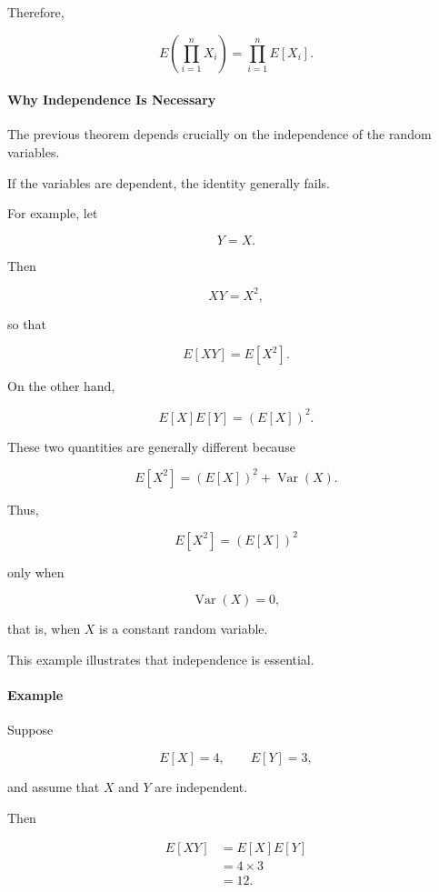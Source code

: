 \documentclass[11pt]{article}
\begin{document}
\begin{mdframed}[
		linewidth=0.8pt,
		roundcorner=6pt,
		backgroundcolor=gray!5,
		linecolor=gray!60,
		innertopmargin=10pt,
		innerbottommargin=10pt,
		innerleftmargin=10pt,
		innerrightmargin=10pt
		]
		Therefore,
		
		\[
		\boxed{
			E\!\left(
			\prod_{i=1}^{n}X_i
			\right)
			=
			\prod_{i=1}^{n}E[X_i].
		}
		\]
		
		\bigskip
		
		\paragraph{Why Independence Is Necessary}
		
		The previous theorem depends crucially on the independence of the random
		variables.
		
		If the variables are dependent, the identity generally fails.
		
		For example, let
		
		\[
		Y=X.
		\]
		
		Then
		
		\[
		XY=X^2,
		\]
		
		so that
		
		\[
		E[XY]
		=
		E[X^2].
		\]
		
		On the other hand,
		
		\[
		E[X]E[Y]
		=
		(E[X])^2.
		\]
		
		These two quantities are generally different because
		
		\[
		E[X^2]
		=
		(E[X])^2+\operatorname{Var}(X).
		\]
		
		Thus,
		
		\[
		E[X^2]
		=
		(E[X])^2
		\]
		
		only when
		
		\[
		\operatorname{Var}(X)=0,
		\]
		
		that is, when \(X\) is a constant random variable.
		
		This example illustrates that independence is essential.
		
		\bigskip
		
		\paragraph{Example}
		
		Suppose
		
		\[
		E[X]=4,
		\qquad
		E[Y]=3,
		\]
		
		and assume that \(X\) and \(Y\) are independent.
		
		Then
		
		\[
		\begin{aligned}
			E[XY]
			&=
			E[X]E[Y]
			\\[0.3cm]
			&=
			4\times3
			\\[0.3cm]
			&=
			12.
		\end{aligned}
		\]
		

\end{mdframed}
\end{document}
